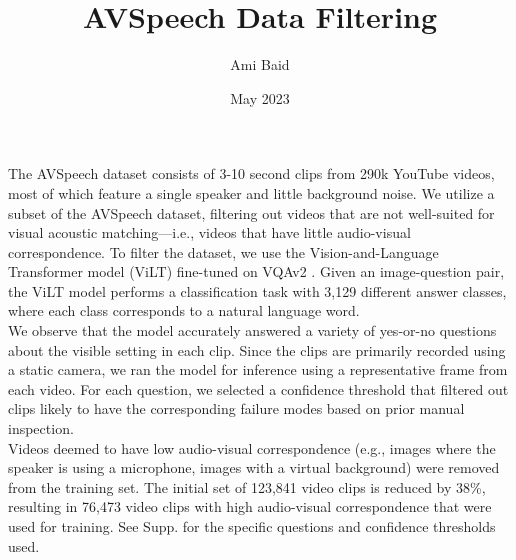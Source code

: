 \documentclass{article}
\title{\textbf{AVSpeech Data Filtering}}
\author{Ami Baid}
\date{May 2023}
\begin{document}
\maketitle

\begin{flushleft}
    \large
    The AVSpeech dataset \cite{DBLP:journals/corr/abs-1804-03619} consists of 3-10 second clips from 290k YouTube videos, most of which feature a single speaker and little background noise. We utilize a subset of the AVSpeech dataset, filtering out videos that are not well-suited for visual acoustic matching—i.e., videos that have little audio-visual correspondence. To filter the dataset, we use the Vision-and-Language Transformer model (ViLT) fine-tuned on VQAv2 \cite{kim2021vilt}. Given an image-question pair, the ViLT model performs a classification task with 3,129 different answer classes, where each class corresponds to a natural language word. \\
    We observe that the model accurately answered a variety of yes-or-no questions about the visible setting in each clip. Since the clips are primarily recorded using a static camera, we ran the model for inference using a representative frame from each video. For each question, we selected a confidence threshold that filtered out clips likely to have the corresponding failure modes based on prior manual inspection. \\
    Videos deemed to have low audio-visual correspondence (e.g., images where the speaker is using a microphone, images with a virtual background) were removed from the training set. The initial set of 123,841 video clips is reduced by 38\%, resulting in 76,473 video clips with high audio-visual correspondence that were used for training. See Supp. for the specific questions and confidence thresholds used. 
\end{flushleft}

\pagebreak
\end{document}
